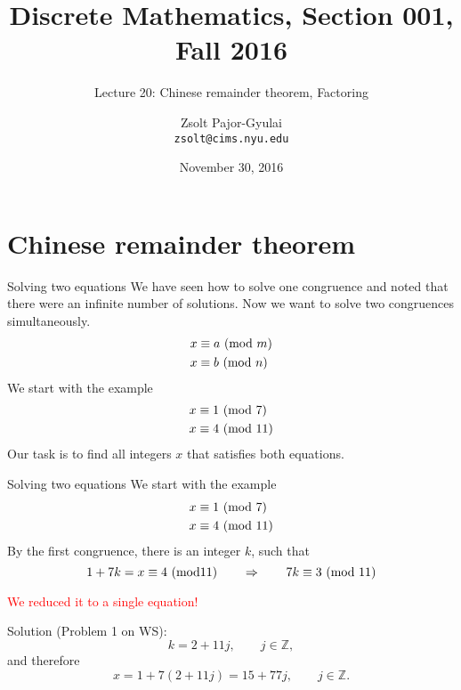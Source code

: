\documentclass{beamer}
\title{Discrete Mathematics, Section 001, Fall 2016}
\subtitle{Lecture 20: Chinese remainder theorem, Factoring}
\date{November 30, 2016}
\author[Zsolt]{Zsolt Pajor-Gyulai \\ \texttt{zsolt@cims.nyu.edu}}
\institute[NYU] 
{
\normalsize Courant Institute of Mathematical Sciences
}
\begin{document}
\begin{frame}
  \titlepage
\end{frame}


\section{Chinese remainder theorem}

\begin{frame}{Solving two equations}
We have seen how to solve one congruence and noted that there were an infinite number of solutions. Now we want to solve two congruences simultaneously.
\begin{align*}
x&\equiv a ~({\rm mod}~m)\\
x&\equiv b ~({\rm mod}~n)
\end{align*}
We start with the example
\begin{align*}
x&\equiv 1 ~({\rm mod}~7)\\
x&\equiv 4 ~({\rm mod}~11)
\end{align*}
Our task is to find all integers $x$ that satisfies both equations.
\end{frame}

\begin{frame}{Solving two equations}
We start with the example
\begin{align*}
x&\equiv 1 ~({\rm mod}~7)\\
x&\equiv 4 ~({\rm mod}~11)
\end{align*}
By the first congruence, there is an integer $k$, such that
\[
1+7k=x\equiv 4~({\rm mod} 11)\qquad\Rightarrow\qquad 7k\equiv 3~({\rm mod}~11)
\]
\begin{center}
\textcolor{red}{We reduced it to a single equation!}
\end{center}
Solution (Problem 1 on WS):
\[
k = 2 + 11j,\qquad j\in\mathbb{Z},
\]
and therefore
\[
x=1+7(2+11j)=15+77j,\qquad j\in\mathbb{Z}.
\]
\end{frame}
\end{document}
